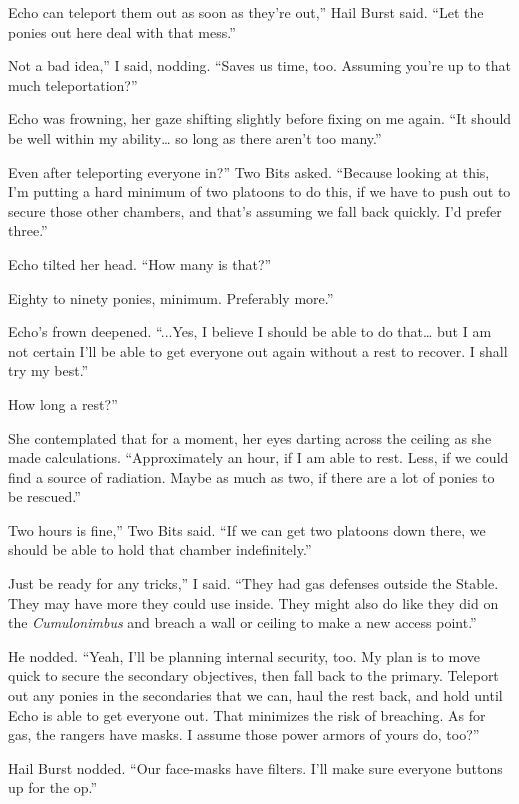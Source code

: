 \leavevmode{}Echo can teleport them out as soon as they’re out,” Hail Burst said. “Let the ponies out here deal with that mess.”

\leavevmode{}Not a bad idea,” I said, nodding. “Saves us time, too. Assuming you’re up to that much teleportation?”

Echo was frowning, her gaze shifting slightly before fixing on me again. “It should be well within my ability… so long as there aren’t too many.”

\leavevmode{}Even after teleporting everyone in?” Two Bits asked. “Because looking at this, I’m putting a hard minimum of two platoons to do this, if we have to push out to secure those other chambers, and that’s assuming we fall back quickly. I’d prefer three.”

Echo tilted her head. “How many is that?”

\leavevmode{}Eighty to ninety ponies, minimum. Preferably more.”

Echo’s frown deepened. “...Yes, I believe I should be able to do that… but I am not certain I’ll be able to get everyone out again without a rest to recover. I shall try my best.”

\leavevmode{}How long a rest?”

She contemplated that for a moment, her eyes darting across the ceiling as she made calculations. “Approximately an hour, if I am able to rest. Less, if we could find a source of radiation. Maybe as much as two, if there are a lot of ponies to be rescued.”

\leavevmode{}Two hours is fine,” Two Bits said. “If we can get two platoons down there, we should be able to hold that chamber indefinitely.”

\leavevmode{}Just be ready for any tricks,” I said. “They had gas defenses outside the Stable. They may have more they could use inside. They might also do like they did on the \textit{Cumulonimbus} and breach a wall or ceiling to make a new access point.”

He nodded. “Yeah, I’ll be planning internal security, too. My plan is to move quick to secure the secondary objectives, then fall back to the primary. Teleport out any ponies in the secondaries that we can, haul the rest back, and hold until Echo is able to get everyone out. That minimizes the risk of breaching. As for gas, the rangers have masks. I assume those power armors of yours do, too?”

Hail Burst nodded. “Our face-masks have filters. I’ll make sure everyone buttons up for the op.”

